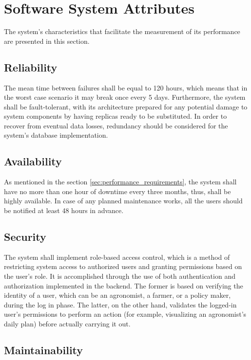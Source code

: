 \section{Software System Attributes}

The system's characteristics that facilitate the measurement of its performance are presented in this section.

\subsection{Reliability}

The mean time between failures shall be equal to 120 hours, which means that in the worst case scenario it may break once every 5 days. Furthermore, the system shall be fault-tolerant, with its architecture prepared for any potential damage to system components by having replicas ready to be substituted. In order to recover from eventual data losses, redundancy should be considered for the system's database implementation.

\subsection{Availability}

As mentioned in the section \ref{sec:performance_requirements}, the system shall have no more than one hour of downtime every three months, thus, shall be highly available. In case of any planned maintenance works, all the users should be notified at least 48 hours in advance.

\subsection{Security}

The system shall implement role-based access control, which is a method of restricting system access to authorized users and granting permissions based on the user's role. It is accomplished through the use of both authentication and authorization implemented in the backend. The former is based on verifying the identity of a user, which can be an agronomist, a farmer, or a policy maker, during the log in phase. The latter, on the other hand, validates the logged-in user's permissions to perform an action (for example, visualizing an agronomist's daily plan) before actually carrying it out.

\subsection{Maintainability}

